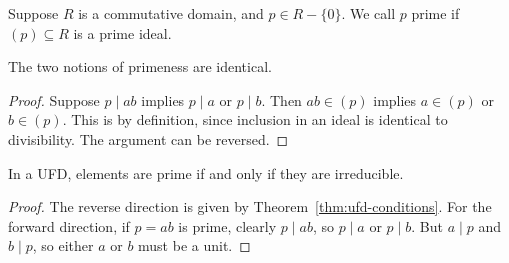 \begin{definition}
    Suppose \(R\) is a commutative domain, and \(p \in R - \{0\}\).
    We call \(p\) prime if \((p) \subseteq R\) is a prime ideal.
\end{definition}
\begin{proposition}
    The two notions of primeness are identical.
\end{proposition}
\begin{proof}
    Suppose \(p \mid ab\) implies \(p \mid a\) or \(p \mid b\).
    Then \(ab \in (p)\) implies \(a \in (p)\) or \(b \in (p)\).
    This is by definition,
    since inclusion in an ideal is identical to divisibility.
    The argument can be reversed.
\end{proof}
\begin{lemma}
    In a UFD, elements are prime if and only if they are irreducible.
\end{lemma}
\begin{proof}
    The reverse direction is given by Theorem~\ref{thm:ufd-conditions}.
    For the forward direction,
    if \(p = ab\) is prime, clearly \(p \mid ab\),
    so \(p \mid a\) or \(p \mid b\).
    But \(a \mid p\) and \(b \mid p\),
    so either \(a\) or \(b\) must be a unit.
\end{proof}

